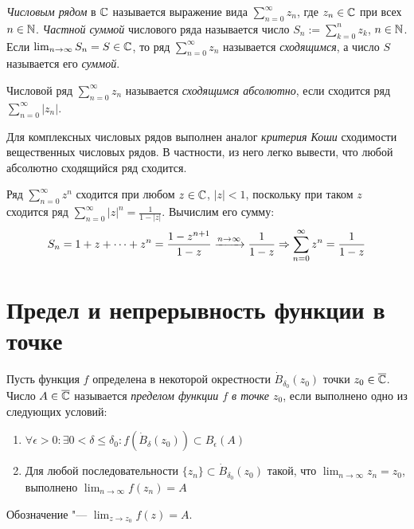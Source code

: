 \begin{definition}
	\textit{Числовым рядом} в $\mathbb{C}$ называется выражение вида $\sum_{n = 0}^\infty z_n$, где $z_n \in \mathbb{C}$ при всех $n \in \mathbb{N}$. \textit{Частной суммой} числового ряда называется число $S_n := \sum_{k = 0}^nz_k$, $n \in \mathbb{N}$. Если $\lim_{n \to \infty}S_n = S \in \mathbb{C}$, то ряд $\sum_{n = 0}^\infty z_n$ называется \textit{сходящимся}, а число $S$ называется его \textit{суммой}.
\end{definition}

\begin{definition}
	Числовой ряд $\sum_{n = 0}^\infty z_n$ называется \textit{сходящимся абсолютно}, если сходится ряд $\sum_{n = 0}^\infty|z_n|$.
\end{definition}

\begin{note}
	Для комплексных числовых рядов выполнен аналог \textit{критерия Коши} сходимости вещественных числовых рядов. В частности, из него легко вывести, что любой абсолютно сходящийся ряд сходится.
\end{note}

\begin{example}
	Ряд $\sum_{n=0}^\infty z^n$ сходится при любом $z \in \mathbb{C}$, $|z| < 1$, поскольку при таком $z$ сходится ряд $\sum_{n=0}^\infty |z|^n = \frac1{1-|z|}$. Вычислим его сумму:
	\[S_n = 1 + z + \dotsb + z^n = \frac{1-z^{n+1}}{1-z} \xrightarrow{n \to \infty} \frac1{1-z} \Rightarrow \sum_{n=0}^\infty z^n = \frac1{1-z}\]
\end{example}

\section{Предел и непрерывность функции в точке}

\begin{definition}
	Пусть функция $f$ определена в некоторой окрестности $\dot B_{\delta_0}(z_0)$ точки $z_0 \in \overline{\mathbb{C}}$. Число $A \in \overline{\mathbb{C}}$ называется \textit{пределом функции $f$ в точке $z_0$}, если выполнено одно из следующих условий:
	\begin{enumerate}
		\item $\forall \epsilon > 0: \exists 0 < \delta \le \delta_0: f(\dot B_\delta(z_0)) \subset B_\epsilon(A)$
		\item Для любой последовательности $\{z_n\} \subset \dot B_{\delta_0}(z_0)$ такой, что $\lim_{n \to \infty}z_n = z_0$, выполнено $\lim_{n \to \infty}f(z_n) = A$
	\end{enumerate}
	
	Обозначение "--- $\lim_{z \to z_0}f(z) = A$.
\end{definition}

